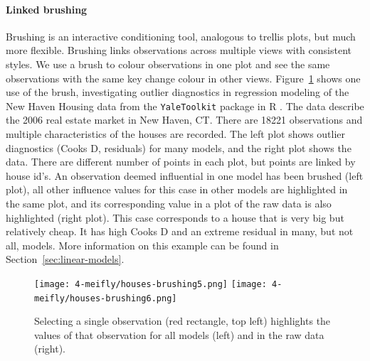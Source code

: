 \documentclass[preprint]{imsart}
\begin{document}
\paragraph{Linked brushing} Brushing is an interactive conditioning tool, analogous to trellis plots, but much more flexible. Brushing links observations across multiple views with consistent styles. We use a brush to colour observations in one plot and see the same observations with the same key change colour in other views. Figure~\ref{fig:brushing} shows one use of the brush, investigating outlier diagnostics in regression modeling of the New Haven Housing data from the {\tt YaleToolkit} package in R \citep{emerson}. The data describe the 2006 real estate market in New Haven, CT. There are 18221 observations and multiple characteristics of the houses are recorded. The left plot shows outlier diagnostics (Cooks D, residuals) for many models, and the right plot shows the data. There are different number of points in each plot, but points are linked by house id's.  An observation deemed influential in one model has been brushed (left plot), all other influence values for this case in other models are highlighted in the same plot, and its corresponding value in a plot of the raw data is also highlighted (right plot). This case corresponds to a house that is very big but relatively cheap. It has high Cooks D and an extreme residual in many, but not all, models. More information on this example can be found in Section~\ref{sec:linear-models}.

\begin{figure}[htbp]
	\centering
  \texttt{[image: 4-meifly/houses-brushing5.png]}
  \texttt{[image: 4-meifly/houses-brushing6.png]}

	\caption{Selecting a single observation (red rectangle, top left) highlights the values of that observation for all models (left) and in the raw data (right).}
	\label{fig:brushing}
\end{figure}

\end{document}
